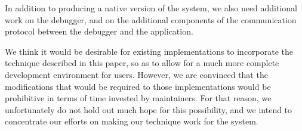 In addition to producing a native version of the \sicl{} system, we
also need additional work on the \clordane{} debugger, and on the
additional components of the communication protocol between the
debugger and the application.

We think it would be desirable for existing \commonlisp{}
implementations to incorporate the technique described in this paper,
so as to allow for a much more complete development environment for
users.  However, we are convinced that the modifications that would be
required to those implementations would be prohibitive in terms of
time invested by maintainers.  For that reason, we unfortunately do
not hold out much hope for this possibility, and we intend to
concentrate our efforts on making our technique work for the \sicl{}
system.
